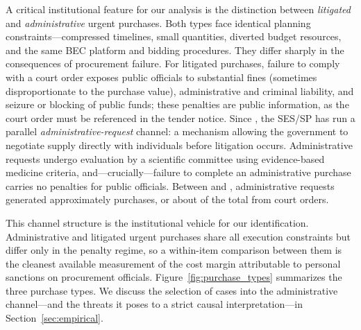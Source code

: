 A critical institutional feature for our analysis is the distinction between \textit{litigated} and \textit{administrative} urgent purchases. Both types face identical planning constraints---compressed timelines, small quantities, diverted budget resources, and the same BEC platform and bidding procedures. They differ sharply in the consequences of procurement failure. For litigated purchases, failure to comply with a court order exposes public officials to substantial fines (sometimes disproportionate to the purchase value), administrative and criminal liability, and seizure or blocking of public funds; these penalties are public information, as the court order must be referenced in the tender notice. Since \BPsampleStartYear, the SES/SP has run a parallel \textit{administrative-request} channel: a mechanism allowing the government to negotiate supply directly with individuals before litigation occurs. Administrative requests undergo evaluation by a scientific committee using evidence-based medicine criteria, and---crucially---failure to complete an administrative purchase carries no penalties for public officials. Between \BPsampleStartYear{} and \BPsampleEndYear, administrative requests generated approximately \BPadminPurchasesTotal{} purchases, or about \BPadminToCourtShare{} of the total from court orders.

This channel structure is the institutional vehicle for our identification. Administrative and litigated urgent purchases share all execution constraints but differ only in the penalty regime, so a within-item comparison between them is the cleanest available measurement of the cost margin attributable to personal sanctions on procurement officials. Figure~\ref{fig:purchase_types} summarizes the three purchase types. We discuss the selection of cases into the administrative channel---and the threats it poses to a strict causal interpretation---in Section~\ref{sec:empirical}.

